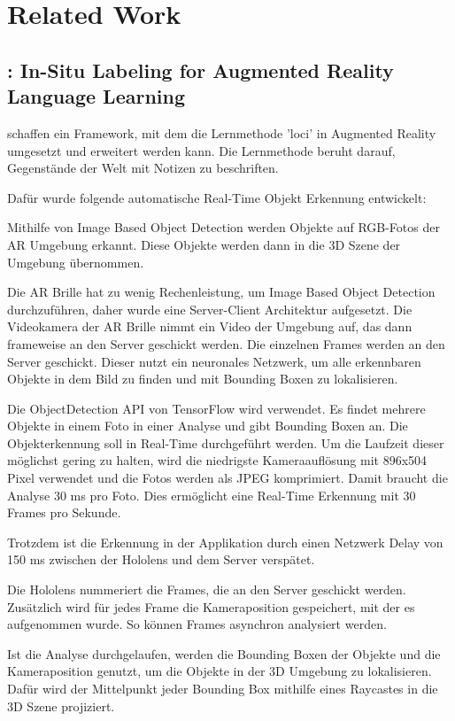\section{Related Work}

\subsection{\cite{LabelingLanguageLearning}: In-Situ Labeling for Augmented Reality Language Learning}
\cite{LabelingLanguageLearning} schaffen ein Framework, mit dem die Lernmethode 'loci' in Augmented Reality umgesetzt und erweitert werden kann. Die Lernmethode beruht darauf, Gegenstände der Welt mit Notizen zu beschriften. 

Dafür wurde folgende automatische Real-Time Objekt Erkennung entwickelt:

Mithilfe von Image Based Object Detection werden Objekte auf RGB-Fotos der AR Umgebung erkannt. Diese Objekte werden dann in die 3D Szene der Umgebung übernommen. 

Die AR Brille hat zu wenig Rechenleistung, um Image Based Object Detection durchzuführen, daher wurde eine Server-Client Architektur aufgesetzt. Die Videokamera der AR Brille nimmt ein Video der Umgebung auf, das dann frameweise an den Server geschickt werden. Die einzelnen Frames werden an den Server geschickt. Dieser nutzt ein neuronales Netzwerk, um alle erkennbaren Objekte in dem Bild zu finden und mit Bounding Boxen zu lokalisieren.

Die ObjectDetection API von TensorFlow wird verwendet. Es findet mehrere Objekte in einem Foto in einer Analyse und gibt Bounding Boxen an. Die Objekterkennung soll in Real-Time durchgeführt werden. Um die Laufzeit dieser möglichst gering zu halten, wird die niedrigste Kameraauflösung mit 896x504 Pixel verwendet und die Fotos werden als JPEG komprimiert. Damit braucht die Analyse 30 ms pro Foto. Dies ermöglicht eine Real-Time Erkennung mit 30 Frames pro Sekunde. 

Trotzdem ist die Erkennung in der Applikation durch einen Netzwerk Delay von 150 ms zwischen der Hololens und dem Server verspätet.

Die Hololens nummeriert die Frames, die an den Server geschickt werden. Zusätzlich wird für jedes Frame die Kameraposition gespeichert, mit der es aufgenommen wurde. So können Frames asynchron analysiert werden. 

Ist die Analyse durchgelaufen, werden die Bounding Boxen der Objekte und die Kameraposition genutzt, um die Objekte in der 3D Umgebung zu lokalisieren. Dafür wird der Mittelpunkt jeder Bounding Box mithilfe eines Raycastes in die 3D Szene projiziert.

